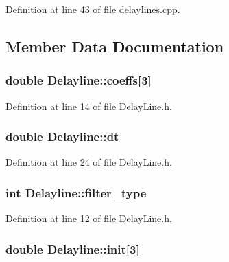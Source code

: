 Definition at line 43 of file delaylines.cpp.



\subsection{Member Data Documentation}
\hypertarget{classDelayline_a2e8e2f168514fb31cea5add2f67a3b45}{
\subsubsection[{coeffs}]{\setlength{\rightskip}{0pt plus 5cm}double {\bf Delayline::coeffs}\mbox{[}3\mbox{]}}}
\label{classDelayline_a2e8e2f168514fb31cea5add2f67a3b45}


Definition at line 14 of file DelayLine.h.

\hypertarget{classDelayline_a3559d3ee05f1d543b499f79c75214ef7}{
\subsubsection[{dt}]{\setlength{\rightskip}{0pt plus 5cm}double {\bf Delayline::dt}}}
\label{classDelayline_a3559d3ee05f1d543b499f79c75214ef7}


Definition at line 24 of file DelayLine.h.

\hypertarget{classDelayline_afe468350e80620d5e9c7b4e3d06fc7b4}{
\subsubsection[{filter\_\-type}]{\setlength{\rightskip}{0pt plus 5cm}int {\bf Delayline::filter\_\-type}}}
\label{classDelayline_afe468350e80620d5e9c7b4e3d06fc7b4}


Definition at line 12 of file DelayLine.h.

\hypertarget{classDelayline_ac9ec3daf7cd4e0f152fadddad4ca2f8b}{
\subsubsection[{init}]{\setlength{\rightskip}{0pt plus 5cm}double {\bf Delayline::init}\mbox{[}3\mbox{]}}}
\label{classDelayline_ac9ec3daf7cd4e0f152fadddad4ca2f8b}


